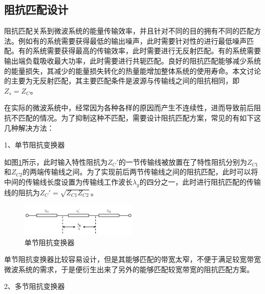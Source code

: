 \documentclass[master]{thesis-uestc}
\begin{document}
\subsection{阻抗匹配设计}
阻抗匹配关系到微波系统的能量传输效率，并且针对不同的目的拥有不同的匹配方法。例如有的系统需要获得最低的输出噪声，此时需要针对性的进行最低噪声匹配。有的系统需要获得最高的传输效率，此时需要进行无反射匹配。有的系统需要输出端负载吸收最大功率，此时需要进行共轭匹配。良好的阻抗匹配能够减少系统的能量损失，其减少的能量损失转化的热量能增加整体系统的使用寿命。本文讨论的主要为无反射匹配，其主要匹配条件是波源与传输线之间的阻抗相同，即\(Z_s=Z_C\)。

在实际的微波系统中，经常因为各种各样的原因而产生不连续性，进而导致前后阻抗不匹配的情况。为了抑制这种不匹配，需要设计阻抗匹配方案，常见的有如下这几种解决方法：

1、单节阻抗变换器

如图\ref{fig:单节阻抗变换器}所示，此时输入特性阻抗为\(Z_C'\)的一节传输线被放置在了特性阻抗分别为\(Z_{C1}\)和\(Z_{C2}\)的两端传输线之间。为了实现前后两节传输线之间的阻抗匹配，此时可以将中间的传输线长度设置为传输线工作波长\(\lambda_g\)的四分之一，此时进行阻抗匹配的传输线的阻抗为\(Z_C'=\sqrt{Z_{C1} Z_{C2}}\)。
\begin{figure}[!htb]
    \centering
    \includegraphics[width=0.5\textwidth]{pic/chapter2/单节阻抗变换器.png}
    \caption{单节阻抗变换器}
    \label{fig:单节阻抗变换器}
\end{figure}
单节阻抗变换器比较容易设计，但是其能够匹配的带宽太窄，不便于满足较宽带宽微波系统的需求，于是便衍生出来了另外的能够匹配较宽带宽的阻抗匹配方案。

2、多节阻抗变换器
\end{document}
